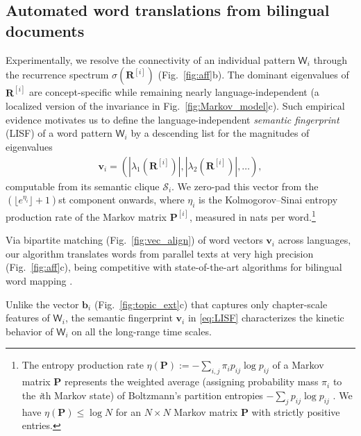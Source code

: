 \documentclass[10pt,journal,compsoc]{IEEEtran}
\begin{document}
\subsection{Automated word translations from bilingual documents}Experimentally, we  resolve the connectivity  of an individual pattern
$ \mathsf W_i$ through  the recurrence spectrum  $ \sigma(\mathbf{ R}^{[i]})$ (Fig.~\ref{fig:aff}b).
The dominant eigenvalues
of $ \mathbf{ R}^{[i]}$ are concept-specific while remaining nearly language-independent (a localized version of the invariance in Fig.~\ref{fig:Markov_model}c).
Such empirical evidence motivates us to define the language-independent \textit{semantic fingerprint} (LISF) of a word  pattern $\mathsf W_i$
 by a descending list for the magnitudes of  eigenvalues \begin{align}\mathbf v_i=(|\lambda_1( \mathbf{ R}^{[i]})|,|\lambda_2( \mathbf{ R}^{[i]})| , \dots),\label{eq:LISF}\end{align}computable from its semantic clique $ \mathscr S_i$. We zero-pad this vector from the   $ (\lfloor e^{\eta_i}\rfloor+1)$st component onwards, where
 $ \eta_i$ is the Kolmogorov--Sinai entropy production rate of the Markov matrix $\mathbf{ P}^{[i]}$, measured in nats per word.\footnote{The entropy production rate   $ \eta(\mathbf P):=-\sum_{i,j}\pi_ip_{ij}\log p_{ij}$   \cite[(4.27)]{CoverThomas} of a Markov matrix $ \mathbf P$ represents the weighted average (assigning probability mass  $\pi_i$ to the \textit{i}th Markov state) of Boltzmann's partition entropies $ -\sum_{j}p_{ij}\log p_{ij}$    \cite[\S8.2]{PollicottYuri}. We have $\eta(\mathbf P)\leq \log N $  for an $ N\times N$  Markov matrix $ \mathbf P$ with strictly positive entries\cite[Theorem~14.1]{PollicottYuri}.}



Via  bipartite matching  (Fig.~\ref{fig:vec_align}) of word vectors $ \mathbf v_i$ across languages, our algorithm translates words   from parallel texts at very high precision  (Fig.~\ref{fig:aff}c), being competitive with state-of-the-art algorithms for bilingual word mapping \cite{Joulin2018,Chen2018}.

Unlike the vector $\mathbf b_i$ (Fig.~\ref{fig:topic_ext}c) that captures only chapter-scale features of $\mathsf W_i$, the semantic fingerprint  $ \mathbf v_i$ in \eqref{eq:LISF} characterizes the kinetic  behavior of $\mathsf W_i$ on all the long-range time scales.
\end{document}
